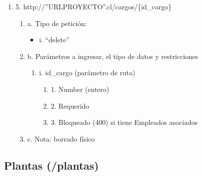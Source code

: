 \begin{enumerate}
    \item 5. http://”URLPROYECTO”.cl/cargos/\{id\_cargo\}
    \begin{enumerate}
        \item a. Tipo de petición:
            \begin{itemize}
               \item i. “delete”
            \end{itemize}
        \item b. Parámetros a ingresar, el tipo de datos y restricciones
            \begin{enumerate}
                \item i. id\_cargo (parámetro de ruta)
                    \begin{enumerate}
                        \item 1. Number (entero)
                        \item 2. Requerido
                        \item 3. Bloqueado (400) si tiene Empleados asociados
                    \end{enumerate}
            \end{enumerate}
        \item c. Nota: borrado físico
    \end{enumerate}
\end{enumerate}

\subsection{Plantas (/plantas)}

